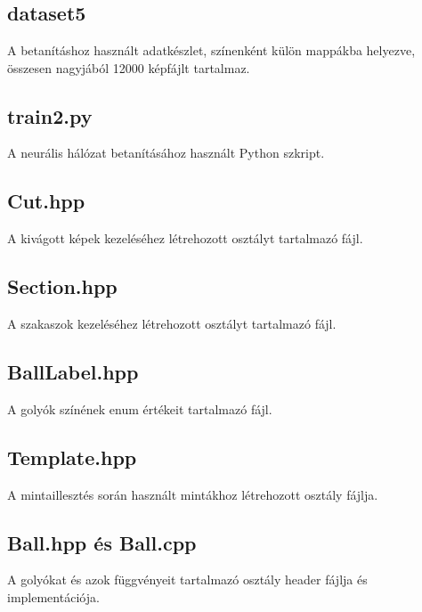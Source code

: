 \appendix
\chapter*{\fuggelek}
\setcounter{chapter}{\appendixnumber}

\section{dataset5}
A betanításhoz használt adatkészlet, színenként külön mappákba helyezve, összesen nagyjából 12000 képfájlt tartalmaz.

\section{train2.py}
A neurális hálózat betanításához használt Python szkript.

\section{Cut.hpp}
A kivágott képek kezeléséhez létrehozott osztályt tartalmazó fájl.

\section{Section.hpp}
A szakaszok kezeléséhez létrehozott osztályt tartalmazó fájl.

\section{BallLabel.hpp}
A golyók színének enum értékeit tartalmazó fájl.

\section{Template.hpp}
A mintaillesztés során használt mintákhoz létrehozott osztály fájlja.

\section{Ball.hpp és Ball.cpp}
A golyókat és azok függvényeit tartalmazó osztály header fájlja és implementációja.

